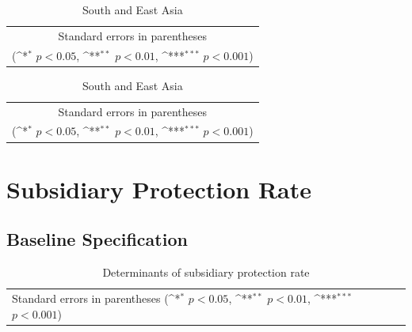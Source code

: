 \documentclass[10pt,a4paper]{scrartcl}
\begin{document}
\begin{table}[!ht]\centering
	\footnotesize
	\renewcommand{\arraystretch}{1.1}
	\def\sym#1{\ifmmode^{#1}\else\(^{#1}\)\fi}
	\caption{Refugee Status Rate: Predicted Pattern}
	\begin{subtable}{.5\linewidth}
		\centering
		\caption{Europe and Central Asia}
		\begin{tabular}{l*{2}{c}}
			\hline\hline
			
			\hline\hline
			\multicolumn{3}{c}{\footnotesize Standard errors in parentheses} \\
			\multicolumn{3}{c}{\footnotesize (\sym{*} \(p<0.05\), \sym{**} \(p<0.01\), \sym{***} \(p<0.001\))}\\
		\end{tabular}
	\end{subtable}%
	\begin{subtable}{.5\linewidth}
		\centering
		\caption{South and East Asia}
		\begin{tabular}{l*{2}{c}}
			\hline\hline
			
			\hline\hline
			\multicolumn{3}{c}{\footnotesize Standard errors in parentheses} \\
			\multicolumn{3}{c}{\footnotesize (\sym{*} \(p<0.05\), \sym{**} \(p<0.01\), \sym{***} \(p<0.001\))}\\
		\end{tabular}
	\end{subtable}%
\end{table}





\clearpage
\FloatBarrier
\section{Subsidiary Protection Rate}
\subsection{Baseline Specification}
\begin{table}[!ht]\centering
	\renewcommand{\arraystretch}{1.25}
	\small
	\def\sym#1{\ifmmode^{#1}\else\(^{#1}\)\fi}
	\caption{Determinants of subsidiary protection rate}
	\begin{tabular}{l*{3}{c}}
		\hline\hline
		
		\hline\hline
		\multicolumn{4}{l}{\footnotesize Standard errors in parentheses (\sym{*} \(p<0.05\), \sym{**} \(p<0.01\), \sym{***} \(p<0.001\))}\\
	\end{tabular}
\end{table}
\end{document}
